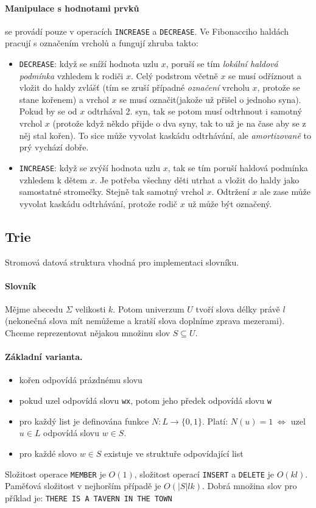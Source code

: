 \documentclass[a4paper]{article}      %
\begin{document}
\paragraph{Manipulace s hodnotami prvků} se provádí pouze v operacích \verb+INCREASE+ a \verb+DECREASE+.
Ve Fibonacciho haldách pracují s označením vrcholů a fungují zhruba takto:
\begin{itemize}
\item \verb+DECREASE+: když se sníží hodnota uzlu $x$, poruší se tím \emph{lokální haldová podmínka} vzhledem k rodiči $x$. Celý podstrom včetně $x$ se musí odříznout a vložit do haldy zvlášť (tím se zruší případné \emph{označení} vrcholu $x$, protože se stane kořenem) a vrchol $x$ se musí označit(jakože už přišel o jednoho syna). Pokud by se od $x$ odtrhával 2. syn, tak se potom musí odtrhnout i samotný vrchol $x$ (protože když někdo přijde o dva syny, tak to už je na čase aby se z něj stal kořen). To sice může vyvolat kaskádu odtrhávání, ale \emph{amortizovaně} to prý vychází dobře.
\item \verb+INCREASE+: když se zvýší hodnota uzlu $x$, tak se tím poruší haldová podmínka vzhledem k dětem $x$. Je potřeba všechny děti utrhat a vložit do haldy jako samostatné stromečky. Stejně tak samotný vrchol $x$. Odtržení $x$ ale zase může vyvolat kaskádu odtrhávání, protože rodič $x$ už může být označený.
\end{itemize}


\subsection{Trie}
Stromová datová struktura vhodná pro implementaci slovníku. 

\paragraph{Slovník}
Mějme abecedu $\Sigma$ velikosti $k$. Potom univerzum $U$ tvoří slova délky právě $l$
(nekonečná slova mít nemůžeme a kratší slova doplníme zprava mezerami). Chceme reprezentovat nějakou množinu slov $S \subseteq U$.

\paragraph{Základní varianta.}
\begin{itemize}
\item kořen odpovídá prázdnému slovu
\item pokud uzel odpovídá slovu \verb+wx+, potom jeho předek odpovídá slovu \verb+w+
\item pro každý list je definována funkce $N: L \rightarrow \lbrace 0,1 \rbrace$. Platí: $N(u)=1\ \Leftrightarrow$ uzel $u \in L$ odpovídá slovu $w \in S$.
\item pro každé slovo $w \in S$ existuje ve struktuře odpovídající list
\end{itemize}
Složitost operace \verb+MEMBER+ je $O(1)$, složitost operací \verb+INSERT+ a \verb+DELETE+ je $O(kl)$. Paměťová složitost v nejhorším případě je $O(|S|lk)$. Dobrá množina slov pro příklad je: \verb+THERE IS A TAVERN IN THE TOWN+
\end{document}
